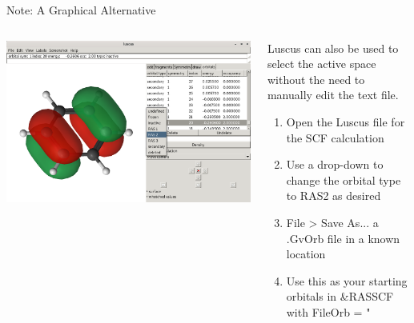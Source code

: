 \documentclass[12pt,aspectratio=169]{beamer}
\begin{document}
	\begin{frame}{Note: A Graphical Alternative}
		\begin{columns}
			\begin{column}{.5\linewidth}
				\includegraphics[width=\linewidth]{select.png}
			\end{column}
			\begin{column}{.5\linewidth}
				
				
				Luscus can also be used to select the active space without the need to manually edit the text file.
				\begin{enumerate}
					\item Open the Luscus file for the SCF calculation
					\item Use a drop-down to change the orbital type to RAS2 as desired
					\item File > Save As... a .GvOrb file in a known location
					\item Use this as your starting orbitals in \&RASSCF with FileOrb = "
				\end{enumerate}
			\end{column}
		\end{columns}
	\end{frame}
\end{document}
